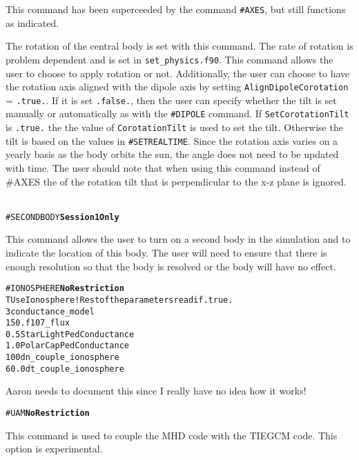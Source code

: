 This command has been superceeded by the command {\tt \#AXES}, but still functions
as indicated.

The rotation of the central body is set with this command.  The rate of rotation
is problem dependent and is set in {\tt set\_physics.f90}.  This command allows
the user to choose to apply rotation or not.  Additionally, the user can choose
to have the rotation axis aligned with the dipole axis by setting 
{\tt AlignDipoleCorotation} = {\tt .true.}.  If it is set {\tt .false.}, then the
user can specify whether the tilt is set manually or automatically 
as with the {\tt \#DIPOLE} command.  If {\tt SetCorotationTilt} is {\tt .true.}
the the value of  {\tt CorotationTilt} is used to set the tilt.  Otherwise the
tilt is based on the values in {\tt \#SETREALTIME}.  Since the rotation axis
varies on a yearly basis as the body orbits the sun, the angle does not need
to be updated with time.  The user should note that when using this command
instead of {\#AXES} the of the rotation tilt that is perpendicular to the 
x-z plane is ignored.
\ \ \\

\begin{alltt}
#SECONDBODY  \hfill {\bf Session 1 Only}
\end{alltt}

This command allows the user to turn on a second body in the simulation and to
indicate the location of this body.  The user will need to ensure that there
is enough resolution so that the body is resolved or the body will have no
effect.
\ \ \\

\begin{alltt}
#IONOSPHERE \hfill {\bf No Restriction}
T                      UseIonosphere  ! Rest of the parameters read if.true.
3                      conductance_model
150.                   f107_flux
0.5                    StarLightPedConductance
1.0                    PolarCapPedConductance
100                    dn_couple_ionosphere
60.0                   dt_couple_ionosphere
\end{alltt}

Aaron needs to document this since I really have no idea how it works!
\ \ \\

\begin{alltt}
#UAM     \hfill  {\bf No Restriction}
\end{alltt}

This command is used to couple the MHD code with the TIEGCM code.
This option is experimental.
\ \ \\

